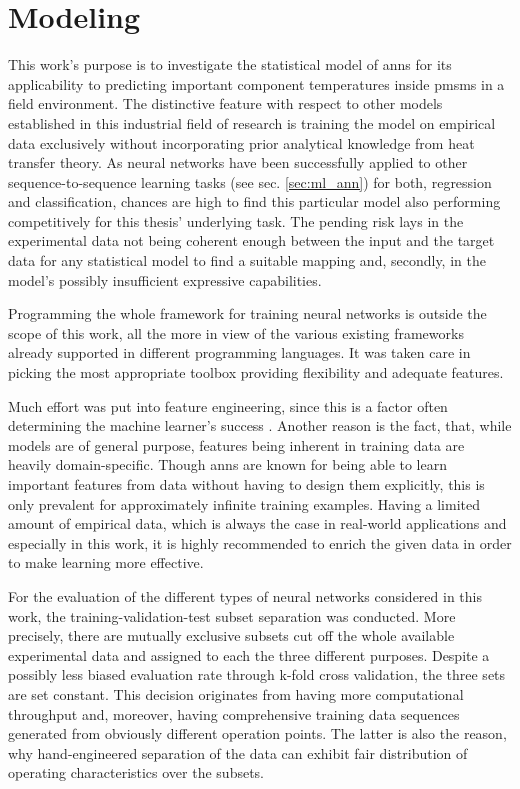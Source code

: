 \chapter{Modeling} 
\label{cha:derivation}
This work's purpose is to investigate the statistical model of \glspl{ann} for its applicability to predicting important component temperatures inside \glspl{pmsm} in a field environment.
The distinctive feature with respect to other models established in this industrial field of research is training the model on empirical data exclusively without incorporating prior analytical knowledge from heat transfer theory.
As neural networks have been successfully applied to other sequence-to-sequence learning tasks (see sec. \ref{sec:ml_ann}) for both, regression and classification, chances are high to find this particular model also performing competitively for this thesis' underlying task.
The pending risk lays in the experimental data not being coherent enough between the input and the target data for any statistical model to find a suitable mapping and, secondly, in the model's possibly insufficient expressive capabilities.

Programming the whole framework for training neural networks is outside the scope of this work, all the more in view of the various existing frameworks already supported in different programming languages.
It was taken care in picking the most appropriate toolbox providing flexibility and adequate features.

Much effort was put into feature engineering, since this is a factor often determining the machine learner's success \cite{Domingo2012}.
Another reason is the fact, that, while models are of general purpose, features being inherent in training data are heavily domain-specific.
Though \glspl{ann} are known for being able to learn important features from data without having to design them explicitly, this is only prevalent for approximately infinite training examples.
Having a limited amount of empirical data, which is always the case in real-world applications and especially in this work, it is highly recommended to enrich the given data in order to make learning more effective. 

For the evaluation of the different types of neural networks considered in this work, the training-validation-test subset separation was conducted.
More precisely, there are mutually exclusive subsets cut off the whole available experimental data and assigned to each the three different purposes.
Despite a possibly less biased evaluation rate through k-fold cross validation, the three sets are set constant.
This decision originates from having more computational throughput and, moreover, having comprehensive training data sequences generated from obviously different operation points.
The latter is also the reason, why hand-engineered separation of the data can exhibit fair distribution of operating characteristics over the subsets.
 
